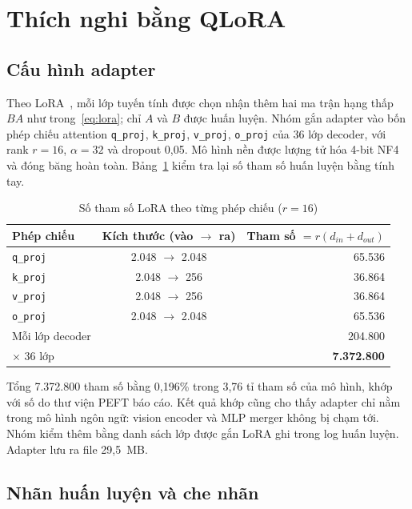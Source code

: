 \section{Thích nghi bằng QLoRA}
\label{sec:met-qlora}

\subsection{Cấu hình adapter}

Theo LoRA~\cite{hu2022lora}, mỗi lớp tuyến tính được
chọn nhận thêm hai ma trận hạng thấp $BA$ như trong~\eqref{eq:lora}; chỉ $A$ và $B$ được huấn luyện. Nhóm
gắn adapter vào bốn phép chiếu attention \texttt{q\_proj}, \texttt{k\_proj},
\texttt{v\_proj}, \texttt{o\_proj} của 36 lớp decoder, với rank $r = 16$,
$\alpha = 32$ và dropout 0,05. Mô hình nền được lượng tử hóa 4-bit NF4 và đóng
băng hoàn toàn. Bảng~\ref{tab:met-params} kiểm tra lại số tham số huấn luyện bằng
tính tay.

\begin{table}[htbp]
\caption{Số tham số LoRA theo từng phép chiếu ($r = 16$)}
\label{tab:met-params}
\centering
\small
\begin{tabular}{lcr}
\toprule
\textbf{Phép chiếu} & \textbf{Kích thước (vào $\to$ ra)} & \textbf{Tham số $= r(d_{in}+d_{out})$} \\
\midrule
\texttt{q\_proj} & 2.048 $\to$ 2.048 & 65.536 \\
\texttt{k\_proj} & 2.048 $\to$ 256 & 36.864 \\
\texttt{v\_proj} & 2.048 $\to$ 256 & 36.864 \\
\texttt{o\_proj} & 2.048 $\to$ 2.048 & 65.536 \\
\midrule
Mỗi lớp decoder & & 204.800 \\
$\times$ 36 lớp & & \textbf{7.372.800} \\
\bottomrule
\end{tabular}
\end{table}

Tổng 7.372.800 tham số bằng 0,196\% trong 3,76 tỉ tham số của mô hình, khớp với
số do thư viện PEFT báo cáo. Kết quả khớp cũng cho thấy adapter chỉ nằm trong mô
hình ngôn ngữ: vision encoder và MLP merger không bị chạm tới. Nhóm kiểm thêm
bằng danh sách lớp được gắn LoRA ghi trong log huấn luyện. Adapter lưu ra file
29,5~MB.

\subsection{Nhãn huấn luyện và che nhãn}
\label{sec:met-labels}

